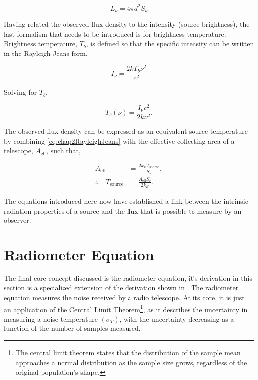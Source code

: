 \begin{equation} \boxed{ 
    L_\nu = 4 \pi d^2 S_\nu 
}
\label{eq:chap2spectralluminosity}
\end{equation}

Having related the observed flux density to the intensity (source brightness), the last formalism that needs to be introduced is for brightness temperature. Brightness temperature, $T_b$, is defined so that the specific intensity can be written in the Rayleigh-Jeans form, 

\begin{equation}
    I_\nu = \frac{2k T_b \nu^2}{c^2}
    \label{eq:chap2RayleighJeans}
\end{equation}

Solving for $T_b$, 

\begin{equation}
    \boxed{ 
    T_b (\nu) = \frac{I_\nu c^2}{2 k \nu^2}.
    }
\end{equation}

The observed flux density can be expressed as an equivalent source temperature by combining \cref{eq:chap2RayleighJeans} with the effective collecting area of a telescope, $A_{\text{eff}}$, such that, 

\begin{align}
A_{\text{eff}} &= \frac{2k_B T_{\text{source}}}{S_\nu}, \\
\therefore\quad
T_{\text{source}} &= \frac{A_{\text{eff}} S_\nu}{2k_B }.
\end{align}

The equations introduced here now have established a link between the intrinsic radiation properties of a source and the flux that is possible to measure by an observer. 

\section{Radiometer Equation} \label{sec:chap2radiometer}

The final core concept discussed is the radiometer equation, it's derivation in this section is a specialized extension of the derivation shown in \citet[§A1.4][]{pulsar_handbook}. The radiometer equation measures the noise received by a radio telescope. At its core, it is just an application of the Central Limit Theorem\footnote{The central limit theorem states that the distribution of the sample mean approaches a normal distribution as the sample size grows, regardless of the original population's shape.}, as it describes the uncertainty in measuring a noise temperature $(\sigma_T)$, with the uncertainty decreasing as a function of the number of samples measured, 

